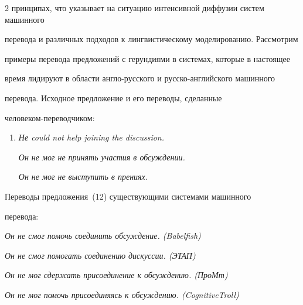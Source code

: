 \begin{multicols}{2}
принципах, что указывает на ситуацию интенсивной диффузии систем машинного 


перевода и различных подходов к лингвистическому моделированию. Рассмотрим 


примеры перевода предложений с герундиями в сис\-те\-мах, которые в настоящее 


время лидируют в области англо-русского и русско-английского машинного 


перевода. Исходное предложение и его переводы, сделанные 


человеком-переводчиком:


\begin{enumerate}[(12)]


\item \textit{Не could not help joining the discussion.}





\textit{Он не мог не принять участия в обсуждении.}





\textit{Он не мог не выступить в прениях.}


\end{enumerate}





Переводы предложения~(12) существующими системами машинного


перевода:





\noindent


\textit{Он не смог помочь соединить обсуждение. (Babelfish)}





\noindent


\textit{Он не смог помогать соединению дискуссии. (ЭТАП)}





\noindent


\textit{Он не мог сдержать присоединение к обсуждению. (ПроМт)}





\noindent


\textit{Он не мог помочь присоединяясь к обсуждению. (CognitiveTroll)}






\end{multicols}
